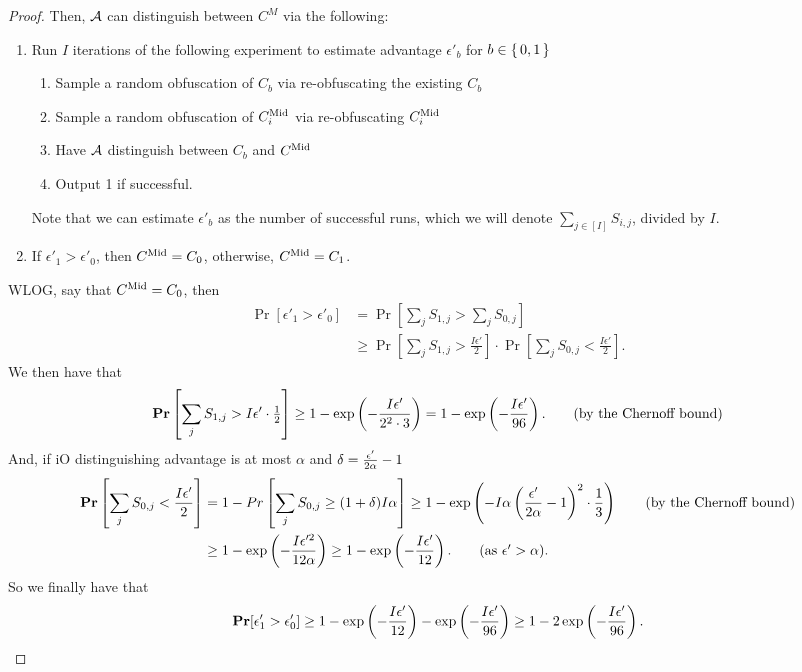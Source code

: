 \begin{lemma}
\begin{proof}
		Then, $\mathcal{A}$ can distinguish between $C^M$ via the following:
		\begin{enumerate}
			\item Run $I$ iterations of the following experiment to estimate advantage $\epsilon'_b$ for $b \in \set{0, 1}$
				\begin{enumerate}
					\item Sample a random obfuscation of $C_b$ via re-obfuscating the existing $C_b$
					\item Sample a random obfuscation of $C^{\text{Mid}}_i$ via re-obfuscating $C^{\text{Mid}}_i$
					\item Have $\mathcal{A}$ distinguish between $C_b$ and $C^{\text{Mid}}$
					\item Output 1 if successful.
				\end{enumerate}
			Note that we can estimate $\epsilon'_b$ as the number of successful runs, which we will denote $\sum_{j \in [I]} S_{i, j}$, divided by $I$.
			\item If $\epsilon'_1 > \epsilon'_0$, then $C^{\text{Mid}} = C_0$, otherwise, $C^{\text{Mid}} = C_1$.
		\end{enumerate}
		WLOG, say that $C^{\text{Mid}} = C_0$, then
		\begin{align*}
			\Pr[\epsilon'_1 > \epsilon'_0] &= \Pr[\sum_{j} S_{1, j} > \sum_{j} S_{0, j}]\\
			&\geq \Pr\left[\sum_{j} S_{1, j} > \frac{I\epsilon'}{2}\right] \cdot \Pr\left[\sum_{j} S_{0, j} < \frac{I\epsilon'}{2}\right].
		\end{align*}
		We then have that
		\begin{align*}
			\operatorname*{\mathbf{Pr}}\left[\sum_{j} S_{1, j} > I\epsilon' \cdot \tfrac{1}{2}\right] \geq 1 - \exp\left( -\frac{I\epsilon'}{2^2 \cdot 3}\right) =  1 - \exp\left( -\frac{I\epsilon'}{96}\right). \tag{by the Chernoff bound}
		\end{align*}
		And, if iO distinguishing advantage is at most $\alpha$ and $\delta = \frac{\epsilon'}{2\alpha} - 1$
		\begin{align*}
			\Pr\left[\sum_{j} S_{0, j} < \frac{I\epsilon'}{2}\right] &= 1 - Pr\left[\sum_{j} S_{0, j} \geq  (1 + \delta) I\alpha\right]
			\geq 1 - \exp\left( - I \alpha \left(\frac{\eps'}{2\alpha} - 1\right)^2 \cdot \frac{1}{3} \right) \tag{by the Chernoff bound}\\
			&\geq 1 - \exp\left( - \frac{I\eps'^2}{12\alpha}\right) \geq 1 - \exp\left(-\frac{I\eps'}{12}\right). \tag{as $\eps' > \alpha$}.
		\end{align*}
		So we finally have that
		\begin{equation}
			\operatorname*{\mathbf{Pr}}[\epsilon'_1 > \epsilon'_0] \geq 1 - \exp\left(-\frac{I\epsilon'}{12}\right) - \exp\left( -\frac{I\epsilon'}{96}\right) \geq 1 - 2\exp\left( -\frac{I\epsilon'}{96}\right). 
		\end{equation}
		

\end{proof}
\end{lemma}
